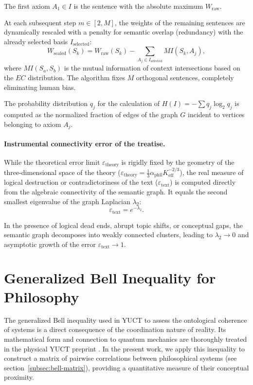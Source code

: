 \documentclass[12pt,a4paper]{article}
\begin{document}
	The first axiom \(A_1 \in I\) is the sentence with the absolute maximum \(W_{\text{raw}}\).
	
	At each subsequent step \(m \in [2, M]\), the weights of the remaining sentences are dynamically rescaled with a penalty for semantic overlap (redundancy) with the already selected basis \(I_{\text{selected}}\):
	\[
	W_{\text{scaled}}(S_{k}) = W_{\text{raw}}(S_{k}) - \sum_{A_{j} \in I_{\text{selected}}} MI(S_{k}, A_{j}),
	\]
	where \(MI(S_a, S_b)\) is the mutual information of context intersections based on the \(EC\) distribution. The algorithm fixes \(M\) orthogonal sentences, completely eliminating human bias.
	
	The probability distribution \(q_{j}\) for the calculation of \(H(I) = -\sum q_j \log_2 q_j\) is computed as the normalized fraction of edges of the graph \(G\) incident to vertices belonging to axiom \(A_{j}\).
	
	\paragraph{Instrumental connectivity error of the treatise.}
	While the theoretical error limit \(\varepsilon_{\text{theory}}\) is rigidly fixed by the geometry of the three-dimensional space of the theory (\(\varepsilon_{\text{theory}} = \frac{1}{3} \alpha_{\text{phil}} K_{\text{eff}}^{-2/3}\)), the real measure of logical destruction or contradictoriness of the text (\(\varepsilon_{\text{text}}\)) is computed directly from the algebraic connectivity of the semantic graph. It equals the second smallest eigenvalue of the graph Laplacian \(\lambda_{2}\):
	\[
	\varepsilon_{\text{text}} = e^{-\lambda_{2}}.
	\]
	
	In the presence of logical dead ends, abrupt topic shifts, or conceptual gaps, the semantic graph decomposes into weakly connected clusters, leading to \(\lambda_2 \to 0\) and asymptotic growth of the error \(\varepsilon_{\text{text}} \to 1\).
	
	\section{Generalized Bell Inequality for Philosophy}
	
	The generalized Bell inequality used in YUCT to assess the ontological coherence of systems is a direct consequence of the coordination nature of reality. Its mathematical form and connection to quantum mechanics are thoroughly treated in the physical YUCT preprint \cite{Yakushev2026b}. In the present work, we apply this inequality to construct a matrix of pairwise correlations between philosophical systems (see section~\ref{subsec:bell-matrix}), providing a quantitative measure of their conceptual proximity.
	
\end{document}
